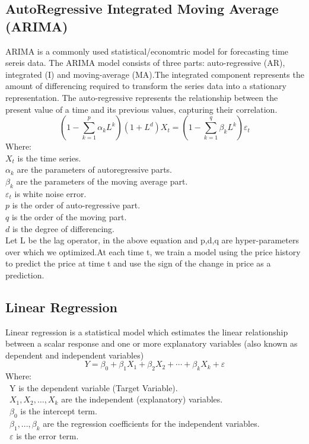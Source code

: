 \documentclass{ieeeojies}
\begin{document}
\subsection{AutoRegressive Integrated
Moving Average (ARIMA)} 
ARIMA is a commonly used statistical/economtric model for forecasting time sereis data. The ARIMA model consists of three parts: auto-regressive (AR), integrated (I) and moving-average (MA).The integrated component represents
the amount of differencing required to transform the series data
into a stationary representation. The auto-regressive represents the relationship between the present value of a time and its previous values, capturing their correlation. 
\begin{equation*}
(1 - \sum_{k=1}^{p} \alpha_k L^k)(1 + L^d)X_t = (1 - \sum_{k=1}^{q} \beta_k L^k) \varepsilon_t
\end{equation*}
Where:\\
\indent \textbullet \(X_t\) is the time series.\\
\indent \textbullet \(\alpha_k\) are the parameters of autoregressive parts. \\
\indent \textbullet \(\beta_k\) are the parameters of the moving average part.\\
\indent \textbullet \(\varepsilon_t\) is white noise error.\\
\indent \textbullet \(p\) is the order of auto-regressive part.\\
\indent \textbullet \(q\) is the order of the moving part.\\
\indent \textbullet \(d\) is the degree of differencing.\\

Let L be the lag operator, in the above equation and p,d,q are hyper-parameters over which we optimized.At each time t, we train a model using the price history to predict the price at time t and use the sign of the change in price as a prediction.
\subsection{Linear Regression}
 Linear regression is a statistical model which estimates the linear relationship between a scalar response and one or more explanatory variables (also known as dependent and independent variables)
 \[Y=\beta_0+\beta_1X_1+\beta_2X_2+\cdots+\beta_kX_k+\varepsilon\]
Where:\\
	\indent\textbullet\ Y is the dependent variable (Target Variable).\\
	\indent\textbullet\ \(X_1, X_2, \ldots, X_k\) are the independent (explanatory) variables.\\
	\indent\textbullet\ \(\beta_0\) is the intercept term.\\
	\indent\textbullet\ \(\beta_1,..., \beta_k\) are the regression coefficients for the independent variables.\\
	\indent\textbullet\ \(\varepsilon\) is the error term.
\end{document}
